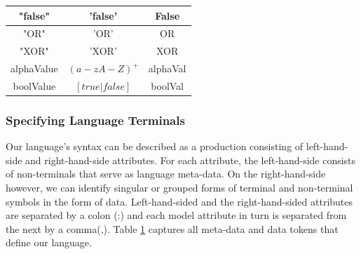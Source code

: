 \documentclass[conference]{IEEEtran}
\begin{document}
\begin{table}[H]
\begin{center}
\begin{tabular}{c c c}
                              "false" & 'false' & False\\ \hline
                              "OR" & 'OR' & OR\\ \hline
                              "XOR" & 'XOR' & XOR\\ \hline
                              alphaValue & $(a-zA-Z)^+$ & alphaVal\\ \hline
                              boolValue & $[true | false]$ & boolVal\\ \hline
\end{tabular}
\label{tab:langlex}
\end{center}
\end{table}

\subsubsection{Specifying Language Terminals}
Our language's syntax can be described as a production consisting of left-hand-side and right-hand-side attributes. For each attribute, the left-hand-side consists of non-terminals that serve as language meta-data. On the right-hand-side however, we can identify singular or grouped forms of terminal and non-terminal symbols in the form of data. Left-hand-sided and the right-hand-sided attributes are separated by a colon (:) and each model attribute in turn is separated from the next by a comma(,). Table \ref{tab:langlex} captures all meta-data and data tokens that define our language.
\end{document}
